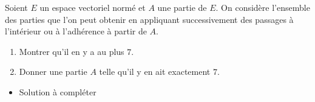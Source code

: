 \begin{enonce}
\begin{exercise}[ID={RMS134 E667},subtitle={Mines-Ponts MP
    2023},concours={mines-ponts},annee={2023},theme={analyse},filiere={MP}, difficulty={0}]
  Soient $E$ un espace vectoriel normé et $A$ une partie de $E$. On
 considère l'ensemble des parties que l'on peut obtenir en appliquant
 successivement des passages à l'intérieur ou à l'adhérence à partir
 de $A$.
 \begin{enumerate}
 \item Montrer qu'il en y a au plus $7$.
 \item Donner une partie $A$ telle qu'il y en ait exactement $7$.
 \end{enumerate}
\end{exercise}
\begin{solution}
  \begin{itemize}
    \item Solution à compléter
  \end{itemize}
\end{solution}
\end{enonce}